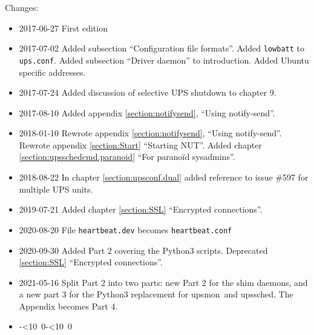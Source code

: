 \documentclass[12pt]{article}
\def\isodate{\leavevmode\hbox{\the\year-\twodigits\month-\twodigits\day}}
\def\twodigits#1{\ifnum#1<10 0\fi\the#1}
\renewcommand{\thepage}{}            %
\newcommand{\newcolumn}{\vfill\eject}
\newcommand{\upsmon}{\mbox{\textcolor{MONCOLOUR}{upsmon}}}
\newcommand{\upssched}{\mbox{\textcolor{SCHEDCOLOUR}{upssched}}}
\newcommand{\notifysend}{\mbox{\textcolor{NOTIFYCOLOUR}{notify-send}}}
\newcommand{\upsconf}{\textcolor{UPSDCOLOUR}{\texttt{ups.conf}}}
\newcommand{\ul}{\begin{itemize}%
   \setlength{\itemsep}{0em}}
\newcommand{\eul}{\end{itemize}}
\newcommand{\li}{\item}                 %
\begin{document}
\vspace*{\fill}
Changes:  

\ul

\li 2017-06-27 First edition 

\li 2017-07-02 Added subsection ``Configuration file formats''.  Added
\texttt{lowbatt} to \upsconf.  Added subsection ``Driver daemon'' to
introduction.  Added Ubuntu specific addresses.

\li 2017-07-24 Added discussion of selective UPS shutdown to chapter 9.

\li 2017-08-10 Added appendix \ref{section:notifysend}, ``Using \notifysend''.

\li 2018-01-10 Rewrote appendix \ref{section:notifysend}, ``Using \notifysend''.
Rewrote appendix \ref{section:Start} ``Starting NUT''.
Added chapter \ref{section:upsschedcmd.paranoid} ``For parano\"id sysadmins''.

\li 2018-08-22 In chapter \ref{section:upsconf.dual} added reference
to issue \#597 for multiple UPS units.

\li 2019-07-21 Added chapter \ref{section:SSL} ``Encrypted connections''.

\li 2020-08-20 File \texttt{heartbeat.dev} becomes \texttt{heartbeat.conf}

\li 2020-09-30 Added Part 2 covering the Python3 scripts. Deprecated
\ref{section:SSL} ``Encrypted connections''.

\li 2021-05-16 Split Part 2 into two parts: new Part 2 for the shim daemons,
and a new part 3 for the Python3 replacement for \upsmon\ and \upssched. The
Appendix becomes Part 4.

\li \isodate

\eul

\vspace*{\fill}
\newcolumn
\tableofcontents
\listoffigures




\newcolumn                           %
\end{document}
